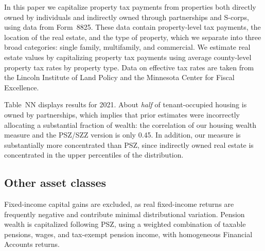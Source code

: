 In this paper we capitalize property tax payments from properties both directly owned by individuals and indirectly owned through partnerships and S-corps, using data from Form~8825. These data contain property-level tax payments, the location of the real estate, and the type of property, which we separate into three broad categories: single family, multifamily, and commercial. We estimate real estate values by capitalizing property tax payments using average county-level property tax rates by property type. Data on effective tax rates are taken from the Lincoln Institute of Land Policy and the Minnesota Center for Fiscal Excellence.

Table~NN displays results for 2021. About \textit{half} of tenant-occupied housing is owned by partnerships, which implies that prior estimates were incorrectly allocating a substantial fraction of wealth: the correlation of our housing wealth measure and the PSZ/SZZ version is only 0.45. In addition, our measure is substantially more concentrated than PSZ, since indirectly owned real estate is concentrated in the upper percentiles of the distribution.

\subsection{Other asset classes}

Fixed-income capital gains are excluded, as real fixed-income returns are frequently negative and contribute minimal distributional variation. Pension wealth is capitalized following PSZ, using a weighted combination of taxable pensions, wages, and tax-exempt pension income, with homogeneous Financial Accounts returns.

